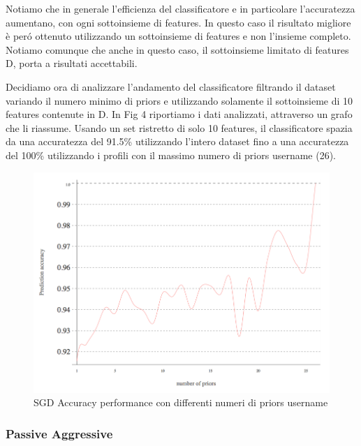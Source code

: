 Notiamo che in generale l'efficienza del classificatore e in particolare l'accuratezza aumentano, con ogni sottoinsieme di features. In questo caso il risultato migliore è peró ottenuto utilizzando un sottoinsieme di features e non l'insieme completo. Notiamo comunque che anche in questo caso, il sottoinsieme limitato di features D, porta a risultati accettabili.\newline

Decidiamo ora di analizzare l'andamento del classificatore filtrando il dataset variando il numero minimo di priors e utilizzando solamente il sottoinsieme di 10 features contenute in D. In Fig 4 riportiamo i dati analizzati, attraverso un grafo che li riassume. Usando un set ristretto di solo 10 features, il classificatore spazia da una accuratezza del 91.5\% utilizzando l'intero dataset fino a una accuratezza del 100\% utilizzando i profili con il massimo numero di priors username (26).


\begin{figure}[bp!]
\centering
\includegraphics[width=130mm]{chapters/plots/accuracy_distribution.png}
\caption{SGD Accuracy performance con differenti numeri di priors username \label{overflow}}
\end{figure}

\subsubsection{Passive Aggressive}

